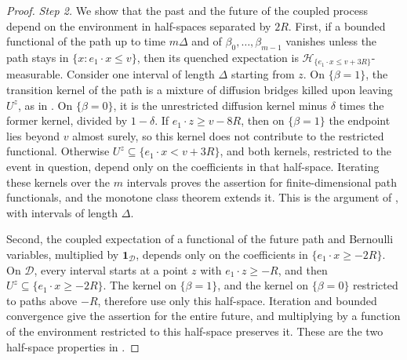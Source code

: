 \documentclass[11pt]{amsart}
\theoremstyle{definition}
\theoremstyle{remark}
\numberwithin{equation}{section}
\begin{document}
\begin{proof}
\emph{Step 2.} We show that the past and the future of the coupled process depend on the environment in half-spaces separated by $2R$. First, if a bounded functional of the path up to time $m\Delta$ and of $\beta_0,\ldots,\beta_{m-1}$ vanishes unless the path stays in $\{x:e_1\cdot x\leq v\}$, then its quenched expectation is $\mathcal H_{\{e_1\cdot x\leq v+3R\}}$-measurable. Consider one interval of length $\Delta$ starting from $z$. On $\{\beta=1\}$, the transition kernel of the path is a mixture of diffusion bridges killed upon leaving $U^z$, as in \citet[Theorem~2.1, formulas~(2.8)--(2.9)]{ballistic2003shen}. On $\{\beta=0\}$, it is the unrestricted diffusion kernel minus $\delta$ times the former kernel, divided by $1-\delta$. If $e_1\cdot z\geq v-8R$, then on $\{\beta=1\}$ the endpoint lies beyond $v$ almost surely, so this kernel does not contribute to the restricted functional. Otherwise $U^z\subseteq\{e_1\cdot x<v+3R\}$, and both kernels, restricted to the event in question, depend only on the coefficients in that half-space. Iterating these kernels over the $m$ intervals proves the assertion for finite-dimensional path functionals, and the monotone class theorem extends it. This is the argument of \citet[items~(3)--(4)]{ballistic2004shen}, with intervals of length $\Delta$.

Second, the coupled expectation of a functional of the future path and Bernoulli variables, multiplied by $\mathbf1_{\mathcal D}$, depends only on the coefficients in $\{e_1\cdot x\geq-2R\}$. On $\mathcal D$, every interval starts at a point $z$ with $e_1\cdot z\geq-R$, and then $U^z\subseteq\{e_1\cdot x\geq-2R\}$. The kernel on $\{\beta=1\}$, and the kernel on $\{\beta=0\}$ restricted to paths above $-R$, therefore use only this half-space. Iteration and bounded convergence give the assertion for the entire future, and multiplying by a function of the environment restricted to this half-space preserves it. These are the two half-space properties in \citet[items~(1)--(2)]{ballistic2004shen}.


\end{proof}
\end{document}

